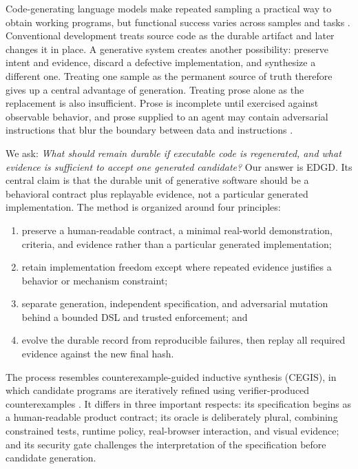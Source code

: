 \documentclass[10pt]{article}
\newcommand{\method}{\textsc{EDGD}\xspace}
\begin{document}
Code-generating language models make repeated sampling a practical way to obtain working programs, but functional success varies across samples and tasks \citep{chen2021codex}. Conventional development treats source code as the durable artifact and later changes it in place. A generative system creates another possibility: preserve intent and evidence, discard a defective implementation, and synthesize a different one. Treating one sample as the permanent source of truth therefore gives up a central advantage of generation. Treating prose alone as the replacement is also insufficient. Prose is incomplete until exercised against observable behavior, and prose supplied to an agent may contain adversarial instructions that blur the boundary between data and instructions \citep{greshake2023indirect,yi2023bipia}.

We ask: \emph{What should remain durable if executable code is regenerated, and what evidence is sufficient to accept one generated candidate?} Our answer is \method. Its central claim is that the durable unit of generative software should be a behavioral contract plus replayable evidence, not a particular generated implementation. The method is organized around four principles:

\begin{enumerate}[leftmargin=*,itemsep=2pt]
  \item preserve a human-readable contract, a minimal real-world demonstration, criteria, and evidence rather than a particular generated implementation;
  \item retain implementation freedom except where repeated evidence justifies a behavior or mechanism constraint;
  \item separate generation, independent specification, and adversarial mutation behind a bounded DSL and trusted enforcement; and
  \item evolve the durable record from reproducible failures, then replay all required evidence against the new final hash.
\end{enumerate}

The process resembles counterexample-guided inductive synthesis (CEGIS), in which candidate programs are iteratively refined using verifier-produced counterexamples \citep{solarlezama2006sketching}. It differs in three important respects: its specification begins as a human-readable product contract; its oracle is deliberately plural, combining constrained tests, runtime policy, real-browser interaction, and visual evidence; and its security gate challenges the interpretation of the specification before candidate generation.
\end{document}
